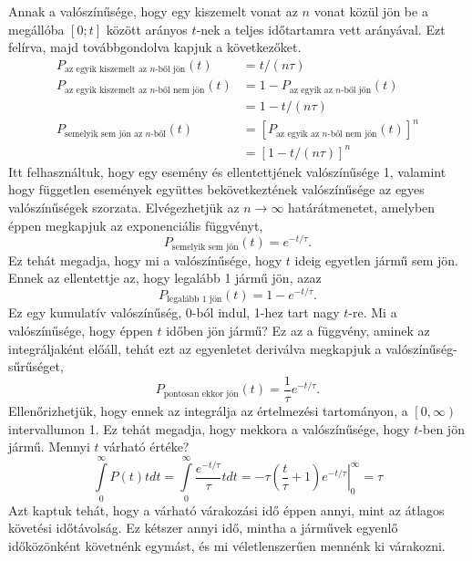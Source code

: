 \documentclass[12pt,a4paper]{article}
\begin{document}
Annak a valószínűsége, hogy egy kiszemelt vonat az $n$ vonat közül jön be a megállóba $\left[ {0;t} \right]$ között arányos $t$-nek a teljes időtartamra vett arányával. Ezt felírva, majd továbbgondolva kapjuk a következőket.
\begin{align}
  {P_{{\text{az egyik kiszemelt az }}n{\text{-ből jön}}}}\left( t \right)     & = t/\left( {n\tau } \right)                                                                        \\
  {P_{{\text{az egyik kiszemelt az }}n{\text{-ből nem jön}}}}\left( t \right) & = 1 - {P_{{\text{az egyik az }}n{\text{-ből jőn}}}}\left( t \right) \nonumber                      \\
                                                                              & = 1 - t/\left( {n\tau } \right)                                                                    \\
  {P_{{\text{semelyik sem jön az }}n{\text{-ből}}}}\left( t \right)           & = {\left[ {{P_{{\text{az egyik az }}n{\text{-ből nem jön}}}}\left( t \right)} \right]^n} \nonumber \\
                                                                              & = {\left[ {1 - t/\left( {n\tau } \right)} \right]^n}
\end{align}
Itt felhasználtuk, hogy egy esemény és ellentettjének valószínűsége 1, valamint hogy független események együttes bekövetkeztének valószínűsége az egyes valószínűségek szorzata. Elvégezhetjük az $n\to \infty$ határátmenetet, amelyben éppen megkapjuk az exponenciális függvényt,
\begin{equation}
  {P_{{\text{semelyik sem jön}}}}\left( t \right) = {e^{ - t/\tau }}.
\end{equation}
Ez tehát megadja, hogy mi a valószínűsége, hogy $t$ ideig egyetlen jármű sem jön. Ennek az ellentettje az, hogy legalább 1 jármű jön, azaz
\begin{equation}  \label{eq:jon}
  {P_{{\text{legalább 1 jön}}}}\left( t \right) = 1 - {e^{ - t/\tau }}.
\end{equation}
Ez egy kumulatív valószínűség, 0-ból indul, 1-hez tart nagy $t$-re. Mi a valószínűsége, hogy éppen $t$ időben jön jármű? Ez az a függvény, aminek az integráljaként  előáll, tehát ezt az egyenletet deriválva megkapjuk a valószínűség-sűrűséget,
\begin{equation}
  {P_{{\text{pontosan ekkor jön}}}}\left( t \right) = \frac{1}{\tau }{e^{ - t/\tau }}.
\end{equation}
Ellenőrizhetjük, hogy ennek az integrálja az értelmezési tartományon, a $\left[ {0,\infty } \right)$ intervallumon 1. Ez tehát megadja, hogy mekkora a valószínűsége, hogy $t$-ben jön jármű. Mennyi $t$ várható értéke?
\begin{equation}
  \int\limits_0^\infty  {P\left( t \right)t} dt = \int\limits_0^\infty  {\frac{{{e^{ - t/\tau }}}}{\tau }t} dt = \left. { - \tau \left( {\frac{t}{\tau } + 1} \right){e^{ - t/\tau }}} \right|_0^\infty  = \tau
\end{equation}
Azt kaptuk tehát, hogy a várható várakozási idő éppen annyi, mint az átlagos követési időtávolság. Ez kétszer annyi idő, mintha a járművek egyenlő időközönként követnénk egymást, és mi véletlenszerűen mennénk ki várakozni.
\end{document}
